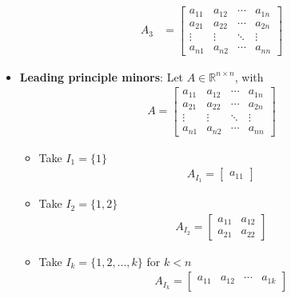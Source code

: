 \documentclass{report}
\begin{document}
\begin{itemize}
\begin{align*}
                        A_{3} &= \begin{bmatrix}
                    a_{11} & a_{12} & \cdots &a_{1n} \\
                    a_{21} & a_{22} & \cdots &a_{2n} \\
                    \vdots & \vdots & \ddots & \vdots \\
                    a_{n1} & a_{n2} & \cdots &a_{nn}
                \end{bmatrix}
            \end{align*}
        \item \textbf{Leading principle minors}: Let $A\in \mathbb{R}^{n\times n}$, with
            \begin{align*}
                A = \begin{bmatrix}
                    a_{11} & a_{12} & \cdots & a_{1n} \\
                    a_{21} & a_{22} & \cdots & a_{2n} \\
                    \vdots & \vdots & \ddots & \vdots \\
                    a_{n1} & a_{n2} & \cdots & a_{nn} 
                \end{bmatrix}
            \end{align*}
            \begin{itemize}
                \item Take $I_{1} = \{1\} $
                    \begin{align*}
                       A_{I_{1}} = \begin{bmatrix} a_{11} \end{bmatrix}
                    \end{align*}
                \item Take $I_{2} = \{1,2\} $
                    \begin{align*}
                        A_{I_{2}} = \begin{bmatrix} a_{11} & a_{12} \\ a_{21} & a_{22} \end{bmatrix}
                    \end{align*}
                \item Take $I_{k} = \{1,2,...,k\} $ for $k < n$
                    \begin{align*}
                        A_{I_{k}} = \begin{bmatrix}
                            a_{11} & a_{12} & \cdots & a_{1k} \\

\end{bmatrix}
\end{align*}
\end{itemize}
\end{itemize}
\end{document}

